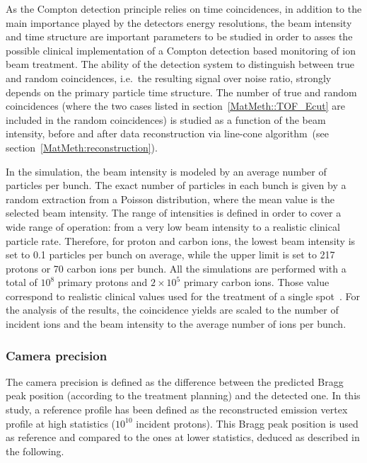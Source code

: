 As the Compton detection principle relies on time coincidences, in addition to the main importance played by the detectors energy resolutions, the beam intensity and time structure are important parameters to be studied in order to asses the possible clinical implementation of a Compton detection based monitoring of ion beam treatment. The ability of the detection system to distinguish between true and random coincidences, i.e.~the resulting signal over noise ratio, strongly depends on the primary particle time structure. The number of true and random coincidences (where the two cases listed in section~\ref{MatMeth::TOF_Ecut} are included in the random coincidences) is studied as a function of the beam intensity, before and after data reconstruction via line-cone algorithm~(see section~\ref{MatMeth:reconstruction}).

In the simulation, the beam intensity is modeled by an average number of particles per bunch. The exact number of particles in each bunch is given by a random extraction from a Poisson distribution, where the mean value is the selected beam intensity. The range of intensities is defined in order to cover a wide range of operation: from a very low beam intensity to a realistic clinical particle rate. Therefore, for proton and carbon ions, the lowest beam intensity is set to 0.1 particles per bunch on average, while the upper limit is set to 217 protons or 70 carbon ions per bunch. All the simulations are performed with a total of $10^{8}$ primary protons and  $2\times10^{5}$ primary carbon ions. Those value correspond to realistic clinical values used for the treatment of a single spot~\cite{Grevillot_2011}. For the analysis of the results, the coincidence yields are scaled to the number of incident ions and the beam intensity to the average number of ions per bunch.

\subsubsection{Camera precision}
\label{MatMeth:precision}

The camera precision is defined as the difference between the predicted Bragg peak position (according to the treatment planning) and the detected one.
In this study, a reference profile has been defined as the reconstructed emission vertex profile at high statistics ($\mathrm{10^{10}}$ incident protons). This Bragg peak position is used as reference and compared to the ones at lower statistics, deduced as described in the following.

